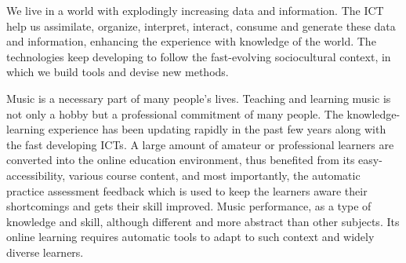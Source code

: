 %
%

\noindent We live in a world with explodingly increasing data and information. The \gls{ICT} help us assimilate, organize, interpret, interact, consume and generate these data and information, enhancing the experience with knowledge of the world. The technologies keep developing to follow the fast-evolving sociocultural context, in which we build tools and devise new methods.

Music is a necessary part of many people's lives. Teaching and learning music is not only a hobby but a professional commitment of many people. The knowledge-learning experience has been updating rapidly in the past few years along with the fast developing \gls{ICT}s. A large amount of amateur or professional learners are converted into the online education environment, thus benefited from its easy-accessibility, various course content, and most importantly, the automatic practice assessment feedback which is used to keep the learners aware their shortcomings and gets their skill improved. Music performance, as a type of knowledge and skill, although different and more abstract than other subjects. Its online learning requires automatic tools to adapt to such context and widely diverse learners.

